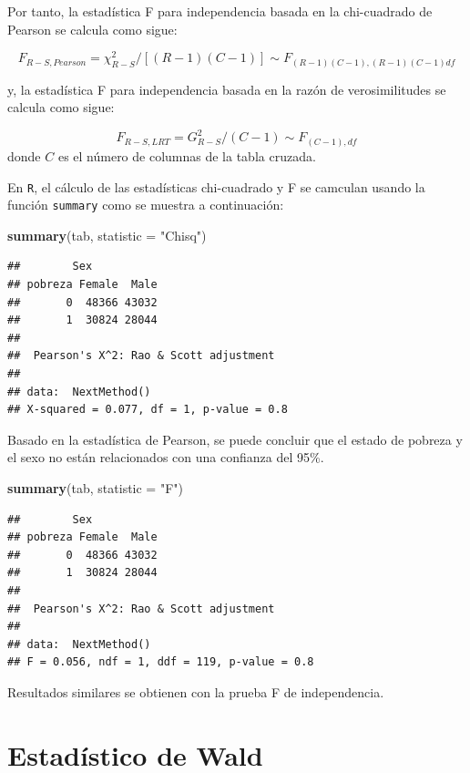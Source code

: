 \documentclass[
  spanish,
  12pt,
]{book}
\newenvironment{Shaded}{\begin{snugshade}}{\end{snugshade}}
\newcommand{\AttributeTok}[1]{\textcolor[rgb]{0.13,0.29,0.53}{#1}}
\newcommand{\FunctionTok}[1]{\textcolor[rgb]{0.13,0.29,0.53}{\textbf{#1}}}
\newcommand{\NormalTok}[1]{#1}
\newcommand{\StringTok}[1]{\textcolor[rgb]{0.31,0.60,0.02}{#1}}
\begin{document}
Por tanto, la estadística F para independencia basada en la chi-cuadrado de Pearson se calcula como sigue:

\[
F_{R-S,Pearson}=\chi_{R-S}^{2}\big/\left[\left(R-1\right)\left(C-1\right)\right]\sim F_{\left(R-1\right)\left(C-1\right),\left(R-1\right)\left(C-1\right)df}
\]

y, la estadística F para independencia basada en la razón de verosimilitudes se calcula como sigue:

\[
F_{R-S,LRT}=G_{R-S}^{2}\big/\left(C-1\right)\sim F_{\left(C-1\right),df}
\]
donde \(C\) es el número de columnas de la tabla cruzada.

En \texttt{R}, el cálculo de las estadísticas chi-cuadrado y F se camculan usando la función \texttt{summary} como se muestra a continuación:

\begin{Shaded}
\begin{Highlighting}[]
\FunctionTok{summary}\NormalTok{(tab, }\AttributeTok{statistic =} \StringTok{"Chisq"}\NormalTok{)}
\end{Highlighting}
\end{Shaded}

\begin{verbatim}
##        Sex
## pobreza Female  Male
##       0  48366 43032
##       1  30824 28044
## 
##  Pearson's X^2: Rao & Scott adjustment
## 
## data:  NextMethod()
## X-squared = 0.077, df = 1, p-value = 0.8
\end{verbatim}

Basado en la estadística de Pearson, se puede concluir que el estado de pobreza y el sexo no están relacionados con una confianza del 95\%.

\begin{Shaded}
\begin{Highlighting}[]
\FunctionTok{summary}\NormalTok{(tab, }\AttributeTok{statistic =} \StringTok{"F"}\NormalTok{)}
\end{Highlighting}
\end{Shaded}

\begin{verbatim}
##        Sex
## pobreza Female  Male
##       0  48366 43032
##       1  30824 28044
## 
##  Pearson's X^2: Rao & Scott adjustment
## 
## data:  NextMethod()
## F = 0.056, ndf = 1, ddf = 119, p-value = 0.8
\end{verbatim}

Resultados similares se obtienen con la prueba F de independencia.

\section{Estadístico de Wald}\label{estaduxedstico-de-wald}
\end{document}
